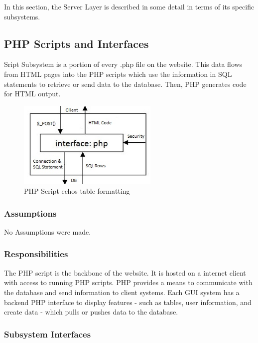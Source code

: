 In this section, the Server Layer is described in some detail in terms of its specific subsystems.

\subsection{PHP Scripts and Interfaces}
Sript Subsystem is a portion of every .php file on the website. This data flows from HTML pages into the PHP scripts which use the information in SQL statements to retrieve or send data to the database. Then, PHP generates code for HTML output.


\begin{figure}[h!]
	\centering
 	\includegraphics[width=0.60\textwidth]{images/PHPScriptSubsystem}
 \caption{PHP Script echos table formatting}
\end{figure}

\subsubsection{Assumptions}
No Assumptions were made.

\subsubsection{Responsibilities}
The PHP script is the backbone of the website. It is hosted on a internet client with access to running PHP scripts. PHP provides a means to communicate with the database and send information to client systems. Each GUI system has a backend PHP interface to display features - such as tables, user information, and create data - which pulls or pushes data to the database.

\subsubsection{Subsystem Interfaces}

